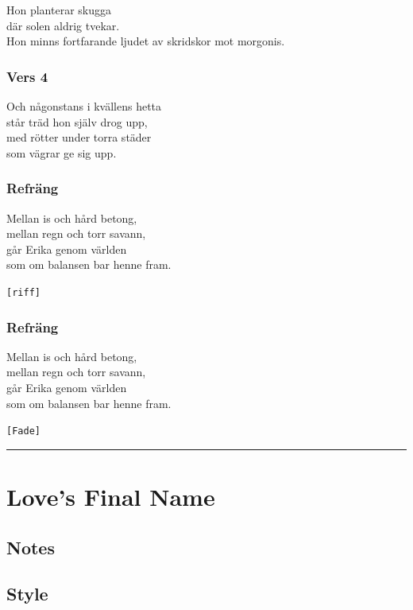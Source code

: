 \documentclass[]{article}
\begin{document}
Hon planterar skugga\\
där solen aldrig tvekar.\\
Hon minns fortfarande ljudet av skridskor mot morgonis.

\subsubsection{Vers 4}\label{vers-4}

Och någonstans i kvällens hetta\\
står träd hon själv drog upp,\\
med rötter under torra städer\\
som vägrar ge sig upp.

\subsubsection{Refräng}\label{refruxe4ng-2}

Mellan is och hård betong,\\
mellan regn och torr savann,\\
går Erika genom världen\\
som om balansen bar henne fram.

\texttt{{[}riff{]}}

\subsubsection{Refräng}\label{refruxe4ng-3}

Mellan is och hård betong,\\
mellan regn och torr savann,\\
går Erika genom världen\\
som om balansen bar henne fram.

\texttt{{[}Fade{]}}

\begin{center}\rule{0.5\linewidth}{0.5pt}\end{center}

\section{Love's Final Name}\label{loves-final-name}

\subsection{Notes}\label{notes-5}

\subsection{Style}\label{style-5}
\end{document}
